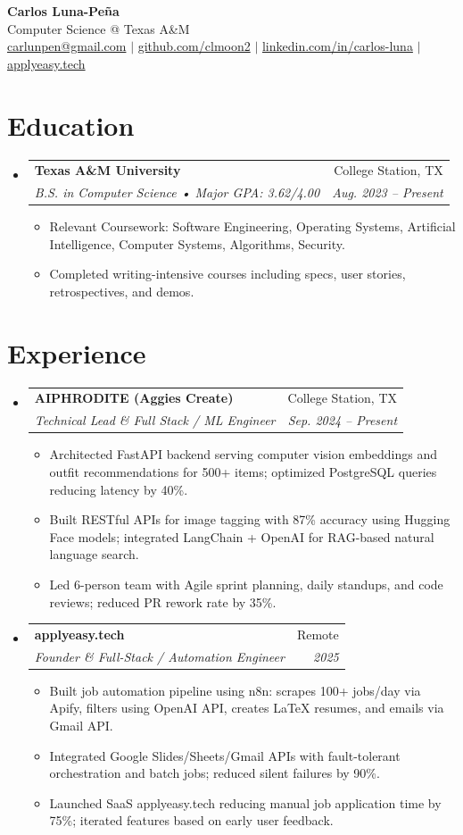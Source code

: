 \documentclass[letterpaper,11pt]{article}
\makeatletter
\newcommand{\resumeItem}[1]{
  \item\small{{#1 \vspace{-2pt}}}
}
\newcommand{\resumeSubheading}[4]{
  \vspace{-2pt}\item
    \begin{tabular*}{0.97\textwidth}[t]{l@{\extracolsep{\fill}}r}
      \textbf{#1} & #2 \\
      \textit{\small#3} & \textit{\small #4} \\
    \end{tabular*}\vspace{-7pt}
}
\newcommand{\resumeSubHeadingListStart}{\begin{itemize}[leftmargin=0.15in, label={}]}
\newcommand{\resumeSubHeadingListEnd}{\end{itemize}}
\newcommand{\resumeItemListStart}{\begin{itemize}}
\newcommand{\resumeItemListEnd}{\end{itemize}\vspace{-5pt}}
\makeatother
\begin{document}
\begin{center}
  \textbf{\Huge Carlos Luna-Pe\~na} \\
  \vspace{2pt}
  Computer Science @ Texas A\&M \\
  \vspace{2pt}
  \href{mailto:carlunpen@gmail.com}{carlunpen@gmail.com} $|$
  \href{https://github.com/clmoon2}{github.com/clmoon2} $|$
  \href{https://linkedin.com/in/carlos-luna}{linkedin.com/in/carlos-luna} $|$
  \href{https://applyeasy.tech}{applyeasy.tech}
\end{center}

\section{Education}
\resumeSubHeadingListStart
  \resumeSubheading{Texas A\&M University}{College Station, TX}
    {B.S. in Computer Science • Major GPA: 3.62/4.00}{Aug. 2023 -- Present}
    \resumeItemListStart
      \resumeItem{Relevant Coursework: Software Engineering, Operating Systems, Artificial Intelligence, Computer Systems, Algorithms, Security.}
      \resumeItem{Completed writing-intensive courses including specs, user stories, retrospectives, and demos.}
    \resumeItemListEnd
\resumeSubHeadingListEnd

\section{Experience}
\resumeSubHeadingListStart
  \resumeSubheading{AIPHRODITE (Aggies Create)}{College Station, TX}
    {Technical Lead \& Full Stack / ML Engineer}{Sep. 2024 -- Present}
    \resumeItemListStart
      \resumeItem{Architected FastAPI backend serving computer vision embeddings and outfit recommendations for 500+ items; optimized PostgreSQL queries reducing latency by 40\%.}
      \resumeItem{Built RESTful APIs for image tagging with 87\% accuracy using Hugging Face models; integrated LangChain + OpenAI for RAG-based natural language search.}
      \resumeItem{Led 6-person team with Agile sprint planning, daily standups, and code reviews; reduced PR rework rate by 35\%.}
    \resumeItemListEnd

  \resumeSubheading{applyeasy.tech}{Remote}
    {Founder \& Full-Stack / Automation Engineer}{2025}
    \resumeItemListStart
      \resumeItem{Built job automation pipeline using n8n: scrapes 100+ jobs/day via Apify, filters using OpenAI API, creates LaTeX resumes, and emails via Gmail API.}
      \resumeItem{Integrated Google Slides/Sheets/Gmail APIs with fault-tolerant orchestration and batch jobs; reduced silent failures by 90\%.}
      \resumeItem{Launched SaaS applyeasy.tech reducing manual job application time by 75\%; iterated features based on early user feedback.}
    \resumeItemListEnd
\resumeSubHeadingListEnd
\end{document}
